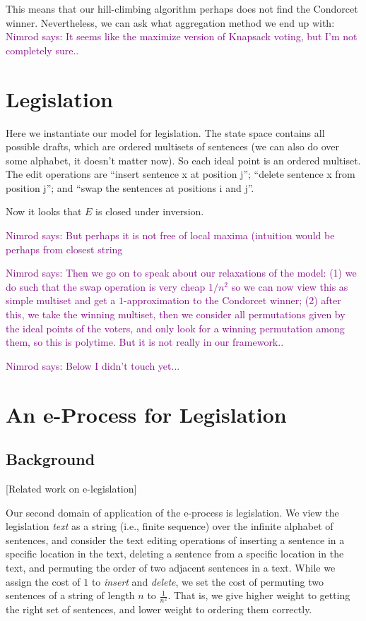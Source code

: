 \documentclass[sigconf]{aamas}  %
\newcommand{\nimrod}[1]{\textcolor{purple}{Nimrod says: #1}}
\begin{document}
This means that our hill-climbing algorithm perhaps does not find the Condorcet winner.
Nevertheless, we can ask what aggregation method we end up with:
  \nimrod{It seems like the maximize version of Knapsack voting, but I'm not completely sure..}


\section{Legislation}

Here we instantiate our model for legislation.
The state space contains all possible drafts, which are ordered multisets of sentences (we can also do over some alphabet, it doesn't matter now). So each ideal point is an ordered multiset. The edit operations are ``insert sentence x at position j''; ``delete sentence x from position j''; and ``swap the sentences at positions i and j''.

Now it looks that $E$ is closed under inversion.

\nimrod{%
But perhaps it is not free of local maxima (intuition would be perhaps from closest string}

\nimrod{Then we go on to speak about our relaxations of the model:
  (1) we do such that the swap operation is very cheap $1/n^2$ so we can now view this as simple multiset and get a $1$-approximation to the Condorcet winner;
  (2) after this, we take the winning multiset, then we consider all permutations given by the ideal points of the voters, and only look for a winning permutation among them, so this is polytime. But it is not really in our framework..}

\nimrod{Below I didn't touch yet...}


\section{An e-Process for Legislation}
\label{section:e-process legislation}

\subsection{Background}

[Related work on e-legislation]

Our second domain of application of the e-process is legislation.
We view the legislation \emph{text} as a string (i.e., finite sequence) over the infinite alphabet of sentences, and consider the text editing operations of inserting a sentence in a specific location in the text, deleting a sentence from a specific location in the text, and permuting the order of two adjacent sentences in a text. While we assign the cost of $1$ to \emph{insert} and \emph{delete}, we set the cost of permuting two sentences of a string of length $n$ to $\frac{1}{n^2}$.  That is, we give higher weight to getting the right set of sentences, and lower weight to ordering them correctly. 
\end{document}
